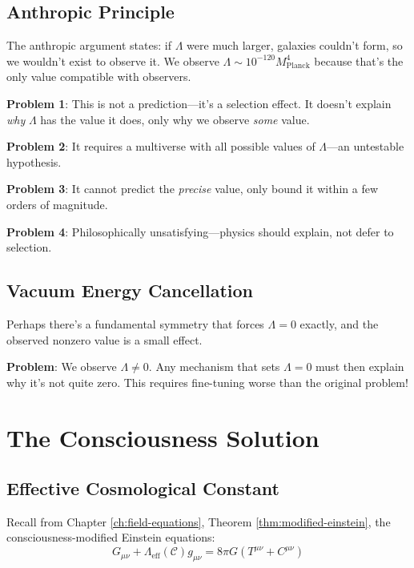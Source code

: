\subsection{Anthropic Principle}

\begin{level2}
The anthropic argument\cite{weinberg1989,vilenkin2006} states: if $\Lambda$ were much larger, galaxies couldn't form, so we wouldn't exist to observe it. We observe $\Lambda \sim 10^{-120} M_{\text{Planck}}^4$ because that's the only value compatible with observers.

\textbf{Problem 1}: This is not a prediction—it's a selection effect. It doesn't explain \textit{why} $\Lambda$ has the value it does, only why we observe \textit{some} value.

\textbf{Problem 2}: It requires a multiverse with all possible values of $\Lambda$—an untestable hypothesis.

\textbf{Problem 3}: It cannot predict the \textit{precise} value, only bound it within a few orders of magnitude.

\textbf{Problem 4}: Philosophically unsatisfying—physics should explain, not defer to selection.
\end{level2}

\subsection{Vacuum Energy Cancellation}

\begin{level2}
Perhaps there's a fundamental symmetry that forces $\Lambda = 0$ exactly, and the observed nonzero value is a small effect\cite{sola2013}.

\textbf{Problem}: We observe $\Lambda \neq 0$. Any mechanism that sets $\Lambda = 0$ must then explain why it's not quite zero. This requires fine-tuning worse than the original problem!
\end{level2}

\section{The Consciousness Solution}

\subsection{Effective Cosmological Constant}

Recall from Chapter \ref{ch:field-equations}, Theorem \ref{thm:modified-einstein}, the consciousness-modified Einstein equations:
\begin{equation}
G_{\mu\nu} + \Lambda_{\text{eff}}(\mathcal{C}) g_{\mu\nu} = 8\pi G (T^{\mu\nu} + C^{\mu\nu})
\end{equation}

